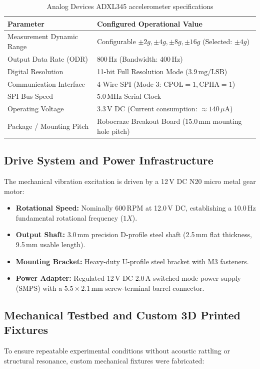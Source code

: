 \begin{table}[H]
\centering
\caption{Analog Devices ADXL345 accelerometer specifications}
\label{tab:adxl345_specs}
\small
\begin{tabularx}{\textwidth}{l X}
\toprule
\textbf{Parameter} & \textbf{Configured Operational Value} \\
\midrule
Measurement Dynamic Range & Configurable $\pm 2g, \pm 4g, \pm 8g, \pm 16g$ (Selected: $\pm 4g$) \\
Output Data Rate (ODR) & 800\,Hz (Bandwidth: 400\,Hz) \\
Digital Resolution & 11-bit Full Resolution Mode ($3.9\,\text{mg/LSB}$) \\
Communication Interface & 4-Wire SPI (Mode 3: $\text{CPOL}=1, \text{CPHA}=1$) \\
SPI Bus Speed & 5.0\,MHz Serial Clock \\
Operating Voltage & 3.3\,V DC (Current consumption: $\approx 140\,\mu\text{A}$) \\
Package / Mounting Pitch & Robocraze Breakout Board (15.0\,mm mounting hole pitch) \\
\bottomrule
\end{tabularx}
\end{table}

\subsection{Drive System and Power Infrastructure}
\hspace{2em}The mechanical vibration excitation is driven by a 12\,V DC N20 micro metal gear motor:
\begin{itemize}
    \item \textbf{Rotational Speed:} Nominally 600\,RPM at 12.0\,V DC, establishing a 10.0\,Hz fundamental rotational frequency ($1X$).
    \item \textbf{Output Shaft:} 3.0\,mm precision D-profile steel shaft (2.5\,mm flat thickness, 9.5\,mm usable length).
    \item \textbf{Mounting Bracket:} Heavy-duty U-profile steel bracket with M3 fasteners.
    \item \textbf{Power Adapter:} Regulated 12\,V DC 2.0\,A switched-mode power supply (SMPS) with a $5.5 \times 2.1$\,mm screw-terminal barrel connector.
\end{itemize}

\subsection{Mechanical Testbed and Custom 3D Printed Fixtures}
\hspace{2em}To ensure repeatable experimental conditions without acoustic rattling or structural resonance, custom mechanical fixtures were fabricated:


